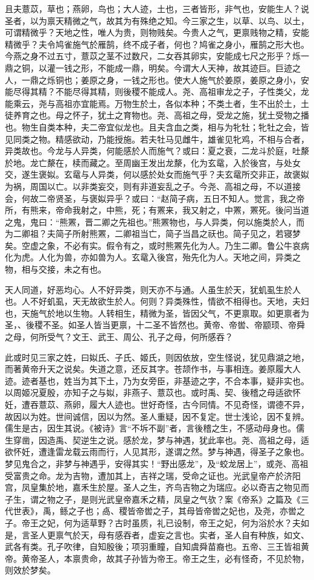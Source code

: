 \documentclass[]{article}
\begin{document}
且夫薏苡，草也；燕卵，鸟也；大人迹，土也，三者皆形，非气也，安能生人？说圣者，以为禀天精微之气，故其为有殊绝之知。今三家之生，以草、以鸟、以土，可谓精微乎？天地之性，唯人为贵，则物贱矣。今贵人之气，更禀贱物之精，安能精微乎？夫令鸠雀施气於雁鹄，终不成子者，何也？鸠雀之身小，雁鹄之形大也。今燕之身不过五寸，薏苡之茎不过数尺，二女吞其卵实，安能成七尺之形乎？烁一鼎之铜，以灌一钱之形，不能成一鼎，明矣。今谓大人天神，故其迹巨。巨迹之人，一鼎之烁铜也；姜原之身，一钱之形也。使大人施气於姜原，姜原之身小，安能尽得其精？不能尽得其精，则後稷不能成人。尧、高祖审龙之子，子性类父，龙能乘云，尧与高祖亦宜能焉。万物生於土，各似本种；不类土者，生不出於土，土徒养育之也。母之怀子，犹土之育物也。尧、高祖之母，受龙之施，犹土受物之播也。物生自类本种，夫二帝宜似龙也。且夫含血之类，相与为牝牡；牝牡之会，皆见同类之物。精感欲动，乃能授施。若夫牡马见雌牛，雄雀见牝鸡，不相与合者，异类故也。今龙与人异类，何能感於人而施气？或曰：夏之衰，二龙斗於庭，吐漦於地。龙亡漦在，椟而藏之。至周幽王发出龙漦，化为玄鼋，入於後宫，与处女交，遂生褒姒。玄鼋与人异类，何以感於处女而施气乎？夫玄鼋所交非正，故褒姒为祸，周国以亡。以非类妄交，则有非道妄乱之子。今尧、高祖之母，不以道接会，何故二帝贤圣，与褒姒异乎？或曰：``赵简子病，五日不知人。觉言，我之帝所，有熊来，帝命我射之，中熊，死；有罴来，我又射之，中罴，罴死。後问当道之鬼，鬼曰：``熊罴，晋二卿之先祖也。''熊罴物也，与人异类，何以施类於人，而为二卿祖？夫简子所射熊罴，二卿祖当亡，简子当昌之祆也。简子见之，若寝梦矣。空虚之象，不必有实。假令有之，或时熊罴先化为人。乃生二卿。鲁公牛哀病化为虎。人化为兽，亦如兽为人。玄鼋入後宫，殆先化为人。天地之间，异类之物，相与交接，未之有也。

天人同道，好恶均心。人不好异类，则天亦不与通。人虽生於天，犹虮虱生於人也。人不好虮虱，天无故欲生於人。何则？异类殊性，情欲不相得也。天地，夫妇也，天施气於地以生物。人转相生，精微为圣，皆因父气，不更禀取。如更禀者为圣，、後稷不圣。如圣人皆当更禀，十二圣不皆然也。黄帝、帝喾、帝颛顼、帝舜之母，何所受气？文王、武王、周公、孔子之母，何所感吞？

此或时见三家之姓，曰姒氏、子氏、姬氏，则因依放，空生怪说，犹见鼎湖之地，而著黄帝升天之说矣。失道之意，还反其字。苍颉作书，与事相连。姜原履大人迹。迹者基也，姓当为其下土，乃为女旁臣，非基迹之字，不合本事，疑非实也。以周姬况夏殷，亦知子之与姒，非燕子、薏苡也。或时禹、契、後稽之母适欲怀妊，遭吞薏苡、燕卵，履大人迹也。世好奇怪，古今同情。不见奇怪，谓德不异，故因以为姓。世间诚信，因以为然。圣人重疑，因不复定。世士浅论，因不复辨。儒生是古，因生其说。《被诗》言``不坼不副''者，言後稽之生，不感动母身也。儒生穿凿，因造禹、契逆生之说。感於龙，梦与神遇，犹此率也。尧、高祖之母，适欲怀妊，遭逢雷龙载云雨而行，人见其形，遂谓之然。梦与神遇，得圣子之象也。梦见鬼合之，非梦与神遇乎，安得其实！``野出感龙''，及``蛟龙居上''，或尧、高祖受富贵之命。龙为吉物，遭加其上，吉祥之瑞，受命之证也。光武皇帝产於济阳宫，凤皇集於地，嘉禾生於屋。圣人之生，齐鸟吉物之为瑞应。必以奇吉之物见而子生，谓之物之子，是则光武皇帝嘉禾之精，凤皇之气欤？案《帝系》之篇及《三代世表》，禹，鲧之子也；卨、稷皆帝喾之子，其母皆帝喾之妃也，及尧，亦喾之子。帝王之妃，何为适草野？古时虽质，礼已设制，帝王之妃，何为浴於水？夫如是，言圣人更禀气於天，母有感吞者，虚妄之言也。实者，圣人自有种族，如文、武各有类。孔子吹律，自知殷後；项羽重瞳，自知虞舜苗裔也。五帝、三王皆祖黄帝。黄帝圣人，本禀贵命，故其子孙皆为帝王。帝王之生，必有怪奇，不见於物，则效於梦矣。
\end{document}
